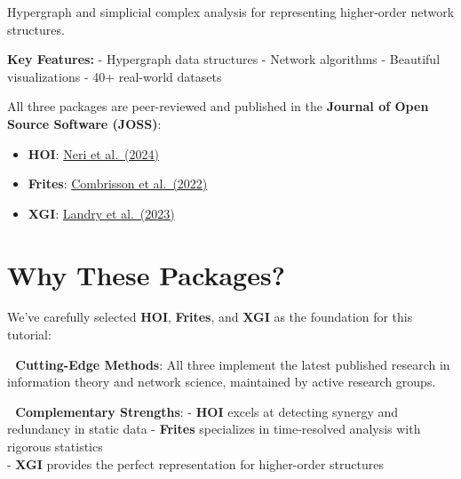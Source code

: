 \documentclass[
  11pt,
  letterpaper,
  oneside,
  openany]{book}
\providecommand{\tightlist}{%
  \setlength{\itemsep}{0pt}\setlength{\parskip}{0pt}}
\begin{document}
Hypergraph and simplicial complex analysis for representing higher-order
network structures.

\textbf{Key Features:} - Hypergraph data structures - Network algorithms
- Beautiful visualizations - 40+ real-world datasets

\begin{tcolorbox}[enhanced jigsaw, colbacktitle=quarto-callout-tip-color!10!white, colframe=quarto-callout-tip-color-frame, toprule=.15mm, toptitle=1mm, bottomtitle=1mm, leftrule=.75mm, titlerule=0mm, title=\textcolor{quarto-callout-tip-color}{\faLightbulb}\hspace{0.5em}{Published Research}, arc=.35mm, rightrule=.15mm, opacityback=0, breakable, opacitybacktitle=0.6, bottomrule=.15mm, left=2mm, coltitle=black, colback=white]

All three packages are peer-reviewed and published in the
\textbf{Journal of Open Source Software (JOSS)}:

\begin{itemize}
\tightlist
\item
  \textbf{HOI}: \href{https://doi.org/10.21105/joss.07360}{Neri et
  al.~(2024)}
\item
  \textbf{Frites}: \href{https://doi.org/10.21105/joss.03842}{Combrisson
  et al.~(2022)}
\item
  \textbf{XGI}: \href{https://doi.org/10.21105/joss.05162}{Landry et
  al.~(2023)}
\end{itemize}

\end{tcolorbox}

\section*{Why These Packages?}\label{why-these-packages}


We've carefully selected \textbf{HOI}, \textbf{Frites}, and \textbf{XGI}
as the foundation for this tutorial:

\textbf{🔬 Cutting-Edge Methods}: All three implement the latest
published research in information theory and network science, maintained
by active research groups.

\textbf{🤝 Complementary Strengths}: - \textbf{HOI} excels at detecting
synergy and redundancy in static data - \textbf{Frites} specializes in
time-resolved analysis with rigorous statistics\\
- \textbf{XGI} provides the perfect representation for higher-order
structures
\end{document}
